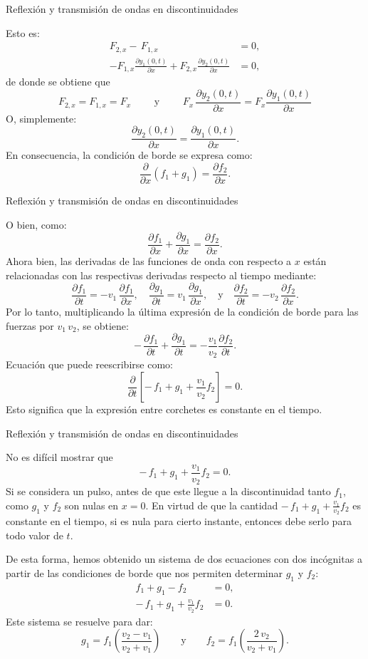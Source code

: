 \documentclass[11pt,handout,aspectratio=1610]{beamer}
\newcommand{\pdiff}[2]{\frac{\partial #1}{\partial #2}}
\newcommand{\vs}{\vspace{11pt}}
\begin{document}
\begin{frame}{Reflexión y transmisión de ondas en discontinuidades}

    Esto es: 
    \begin{align*}
        F_{2,x} - \, F_{1,x} &= 0, \\
        - F_{1,x} \pdiff{y_1 (0,t)}{x} + F_{2,x} \pdiff{y_2 (0,t)}{x} &= 0,
    \end{align*} de donde se obtiene que $$ F_{2,x} = F_{1,x} = F_x \qquad \text{ y } \qquad F_x \, \pdiff{y_2 (0,t)}{x} = F_x \pdiff{y_1 (0,t)}{x} $$ O, simplemente: $$ \pdiff{y_2 (0,t)}{x} = \pdiff{y_1 (0,t)}{x}. $$ En consecuencia, la condición de borde se expresa como: $$ \pdiff{}{x} \left(f_1 + g_1\right) = \pdiff{f_2}{x}. $$

\end{frame}

\begin{frame}{Reflexión y transmisión de ondas en discontinuidades}

    O bien, como: $$ \pdiff{f_1}{x} + \pdiff{g_1}{x} = \pdiff{f_2}{x}. $$ Ahora bien, las derivadas de las funciones de onda con respecto a $x$ están relacionadas con las respectivas derivadas respecto al tiempo mediante: $$ \pdiff{f_1}{t} = - v_1 \, \pdiff{f_1}{x}, \quad \pdiff{g_1}{t} = v_1 \, \pdiff{g_1}{x}, \quad \text{y} \quad \pdiff{f_2}{t} = - v_2 \, \pdiff{f_2}{x}. $$ Por lo tanto, multiplicando la última expresión de la condición de borde para las fuerzas por $ v_1 \, v_2 $, se obtiene: $$ - \, \pdiff{f_1}{t} + \pdiff{g_1}{t} = - \frac{v_1}{v_2} \pdiff{f_2}{t}. $$ Ecuación que puede reescribirse como: $$ \pdiff{}{t} \left[- \, f_1 + g_1 + \frac{v_1}{v_2} f_2 \right] = 0. $$ Esto significa que la expresión entre corchetes es constante en el tiempo. 

\end{frame}

\begin{frame}{Reflexión y transmisión de ondas en discontinuidades}

    No es difícil mostrar que $$ - \, f_1 + g_1 + \frac{v_1}{v_2} f_2 = 0. $$ Si se considera un pulso, antes de que este llegue a la discontinuidad tanto $f_1$, como $g_1$ y $f_2$ son nulas en $x=0$. En virtud de que la cantidad $- \, f_1 + g_1 + \frac{v_1}{v_2} f_2$ es constante en el tiempo, si es nula para cierto instante, entonces debe serlo para todo valor de $t$.

    \vs 

    De esta forma, hemos obtenido un sistema de dos ecuaciones con dos incógnitas a partir de las condiciones de borde que nos permiten determinar $g_1$ y $f_2$:
    \begin{align*}
        f_1 + g_1 - f_2 &= 0, \\
        - \, f_1 + g_1 + \frac{v_1}{v_2} f_2 &= 0.
    \end{align*} Este sistema se resuelve para dar: $$ g_1 = f_1 \left(\frac{v_2 - v_1}{v_2 + v_1}\right) \qquad \text{y} \qquad f_2 = f_1 \left(\frac{2 \, v_2}{v_2 + v_1}\right). $$

\end{frame}
\end{document}

